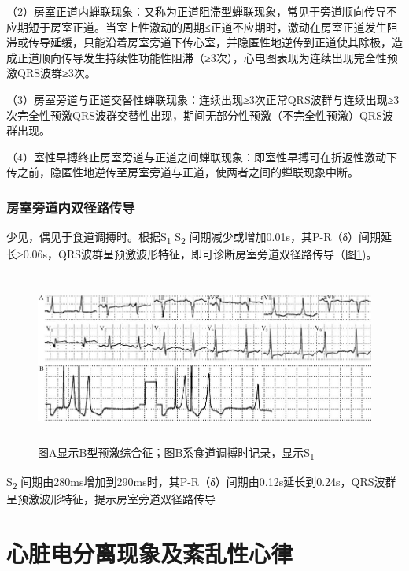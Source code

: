 （2）房室正道内蝉联现象：又称为正道阻滞型蝉联现象，常见于旁道顺向传导不应期短于房室正道。当室上性激动的周期≤正道不应期时，激动在房室正道发生阻滞或传导延缓，只能沿着房室旁道下传心室，并隐匿性地逆传到正道使其除极，造成正道顺向传导发生持续性功能性阻滞（≥3次），心电图表现为连续出现完全性预激QRS波群≥3次。

（3）房室旁道与正道交替性蝉联现象：连续出现≥3次正常QRS波群与连续出现≥3次完全性预激QRS波群交替性出现，期间无部分性预激（不完全性预激）QRS波群出现。

（4）室性早搏终止房室旁道与正道之间蝉联现象：即室性早搏可在折返性激动下传之前，隐匿性地逆传至房室旁道与正道，使两者之间的蝉联现象中断。

\protect\hypertarget{text00036.htmlux5cux23subid430}{}{}

\subsection{房室旁道内双径路传导}

少见，偶见于食道调搏时。根据S\textsubscript{1} S\textsubscript{2}
间期减少或增加0.01s，其P-R（δ）间期延长≥0.06s，QRS波群呈预激波形特征，即可诊断房室旁道双径路传导（图\ref{fig29-11})。

\begin{figure}[!htbp]
 \centering
 \includegraphics[width=5.88542in,height=2.22917in]{./images/Image00495.jpg}
 \captionsetup{justification=centering}
 \caption{图A显示B型预激综合征；图B系食道调搏时记录，显示S\textsubscript{1}}
 \label{fig29-11}
  \end{figure} 
S\textsubscript{2}
间期由280ms增加到290ms时，其P-R（δ）间期由0.12s延长到0.24s，QRS波群呈预激波形特征，提示房室旁道双径路传导

\protect\hypertarget{text00037.html}{}{}

\protect\hypertarget{text00037.htmlux5cux23chapter37}{}{}

\chapter{心脏电分离现象及紊乱性心律}

